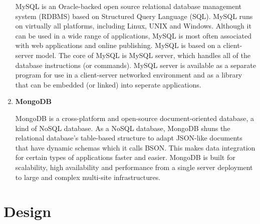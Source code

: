 \begin{enumerate}
    	MySQL is an Oracle-backed open source relational database management system (RDBMS) based on Structured Query Language (SQL). MySQL runs on virtually all platforms, including Linux, UNIX and Windows. Although it can be used in a wide range of applications, MySQL is most often associated with web applications and online publishing.
        MySQL is based on a client-server model. The core of MySQL is MySQL server, which handles all of the database instructions (or commands). MySQL server is available as a separate program for use in a client-server networked environment and as a library that can be embedded (or linked) into seperate applications. 

\item   \textbf{MongoDB}

	MongoDB is a cross-platform and open-source document-oriented database, a kind of NoSQL database. As a NoSQL database, MongoDB shuns the relational database’s table-based structure to adapt JSON-like documents that have dynamic schemas which it calls BSON. 
    This makes data integration for certain types of applications faster and easier. MongoDB is built for scalability, high availability and performance from a single server deployment to large and complex multi-site infrastructures.


	      	      
\end{enumerate}

\clearpage
\section{Design}
